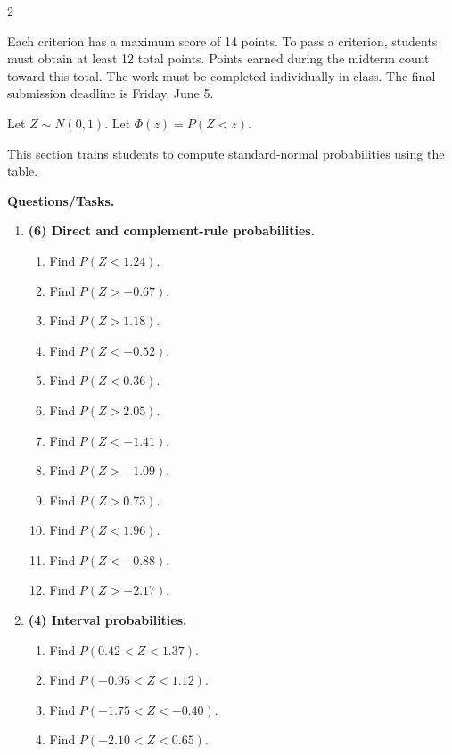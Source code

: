 \begin{multicols}{2}
	
\vspace{-0.25cm}

Each criterion has a maximum score of 14 points. To pass a criterion, students must obtain at least 12 total points. Points earned during the midterm count toward this total.
The work must be completed individually in class.
The final submission deadline is Friday, June 5.
	
\vspace{-0.25cm}

Let \(Z\sim N(0,1)\). Let \(\Phi(z)=P(Z<z)\).

This section trains students to compute standard-normal probabilities using the table.

\textbf{Questions/Tasks.}
\begin{enumerate}[label=\textbf{\alph*)}]
    \item \textbf{(6) Direct and complement-rule probabilities.}
    \begin{enumerate}[label=\textbf{\arabic*)}]
        \item Find \(P(Z<1.24)\).
        \item Find \(P(Z>-0.67)\).
        \item Find \(P(Z>1.18)\).
        \item Find \(P(Z<-0.52)\).
        \item Find \(P(Z<0.36)\).
        \item Find \(P(Z>2.05)\).
        \item Find \(P(Z<-1.41)\).
        \item Find \(P(Z>-1.09)\).
        \item Find \(P(Z>0.73)\).
        \item Find \(P(Z<1.96)\).
        \item Find \(P(Z<-0.88)\).
        \item Find \(P(Z>-2.17)\).
    \end{enumerate}

    \item \textbf{(4) Interval probabilities.}
    \begin{enumerate}[label=\textbf{\arabic*)}]
        \item Find \(P(0.42<Z<1.37)\).
        \item Find \(P(-0.95<Z<1.12)\).
        \item Find \(P(-1.75<Z<-0.40)\).
        \item Find \(P(-2.10<Z<0.65)\).
    \end{enumerate}


\end{enumerate}
\end{multicols}
